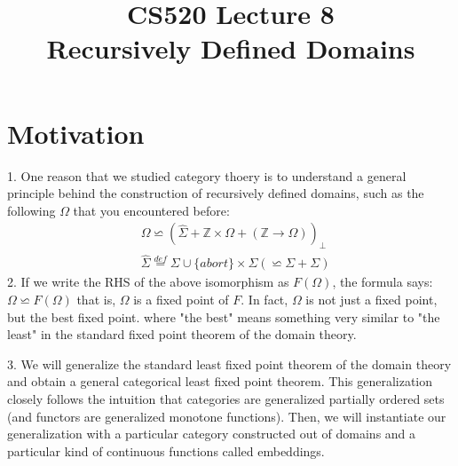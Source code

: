 \documentclass{report}[12pt]
\begin{document}
\setlength\parindent{0pt}

  {\topsep}{\topsep}%
  {\itshape}{}%
  {\bfseries}{}%
  {\newline}{}%

\theoremstyle{break}

\newtheorem{theorem}{Theorem}[section]
\newtheorem{definition}{Definition}
\newtheorem{proposition}{Proposition}
\newtheorem{corollary}{Corollary}
\newtheorem{lemma}{Lemma}
\newtheorem{example}{Example}
\newcommand{\nonterminal}[1]{\langle \text{#1}\rangle}
\newcommand{\rem}[0]{\text{ rem }}
\newcommand{\interp}[1]{\llbracket #1 \rrbracket}
\newcommand{\bbot}[0]{\Perp}
\newcommand{\TODO}[1]{TODO : #1}

\setcounter{chapter}{8}

\title{CS520 Lecture 8\\Recursively Defined Domains}
\maketitle

\section{Motivation}
1. One reason that we studied category thoery is to understand a general principle behind the construction of recursively defined domains, such as the following $\Omega$ that you encountered before:
\begin{align*}
  &\Omega \backsimeq (\hat \Sigma + \mathbb{Z}\times \Omega + (\mathbb{Z}\rightarrow \Omega))_\bot \\
  & \hat \Sigma \stackrel{def}{=} \Sigma \cup \{abort\}\times \Sigma (\backsimeq \Sigma + \Sigma)
\end{align*}
2. If we write the RHS of the above isomorphism as $F(\Omega)$, the formula says: $\Omega \backsimeq F(\Omega)$ that is, $\Omega$ is a fixed point of $F$. In fact, $\Omega$ is not just a fixed point, but the best fixed point. where "the best" means something very similar to "the least" in the standard fixed point theorem of the domain theory.

3. We will generalize the standard least fixed point theorem of the domain theory and obtain a general categorical least fixed point theorem. This generalization closely follows the intuition that categories are generalized partially ordered sets (and functors are generalized monotone functions). Then, we will instantiate our generalization with a particular category constructed out of domains and a particular kind of continuous functions called embeddings.
\end{document}
